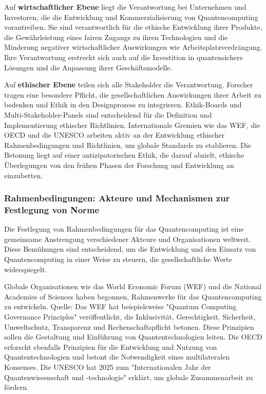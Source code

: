 Auf \textbf{wirtschaftlicher Ebene} liegt die Verantwortung bei  Unternehmen und Investoren, die die Entwicklung und Kommerzialisierung von Quantencomputing vorantreiben.\cite{noauthor_how_2025} Sie sind verantwortlich für die ethische Entwicklung ihrer Produkte, die Gewährleistung eines fairen Zugangs zu ihren Technologien und die Minderung negativer wirtschaftlicher Auswirkungen wie Arbeitsplatzverdrängung.  Ihre Verantwortung erstreckt sich auch auf die Investition in quantensichere Lösungen und die Anpassung ihrer Geschäftsmodelle.\cite{noauthor_quantum_nodate-2}\cite{noauthor_ethical_nodate} 

Auf \textbf{ethischer Ebene} teilen sich alle Stakeholder die Verantwortung. Forscher tragen eine besondere Pflicht, die gesellschaftlichen Auswirkungen ihrer Arbeit zu bedenken und Ethik in den Designprozess zu integrieren.\cite{directory_quantum_nodate} Ethik-Boards und Multi-Stakeholder-Panels sind entscheidend für die Definition und Implementierung ethischer Richtlinien. Internationale Gremien wie das WEF, die OECD und die UNESCO arbeiten aktiv an der Entwicklung ethischer Rahmenbedingungen und Richtlinien, um globale Standards zu etablieren. Die Betonung liegt auf einer antizipatorischen Ethik, die darauf abzielt, ethische Überlegungen von den frühen Phasen der Forschung und Entwicklung an einzubetten.\cite{noauthor_quantum_nodate-7}\cite{noauthor_participate_nodate}

\subsubsection{Rahmenbedingungen: Akteure und Mechanismen zur Festlegung von Norme}
Die Festlegung von Rahmenbedingungen für das Quantencomputing ist eine gemeinsame Anstrengung verschiedener Akteure und Organisationen weltweit. Diese Bemühungen sind entscheidend, um die Entwicklung und den Einsatz von Quantencomputing in einer Weise zu steuern, die gesellschaftliche Werte widerspiegelt.

Globale Organisationen wie das World Economic Forum (WEF) und die National Academies of Sciences haben begonnen, Rahmenwerke für das Quantencomputing zu entwickeln. Quelle: Das WEF hat beispielsweise "Quantum Computing Governance Principles" veröffentlicht, die Inklusivität, Gerechtigkeit, Sicherheit, Umweltschutz, Transparenz und Rechenschaftspflicht betonen. Diese Prinzipien sollen die Gestaltung und Einführung von Quantentechnologien leiten.\cite{noauthor_ethics_nodate} \cite{csiro_global_nodate} Die OECD erforscht ebenfalls Prinzipien für die Entwicklung und Nutzung von Quantentechnologien und betont die Notwendigkeit eines multilateralen Konsenses.\cite{noauthor_quantum_nodate-7} Die UNESCO hat 2025 zum "Internationalen Jahr der Quantenwissenschaft und -technologie" erklärt, um globale Zusammenarbeit zu fördern.\cite{noauthor_participate_nodate} 

